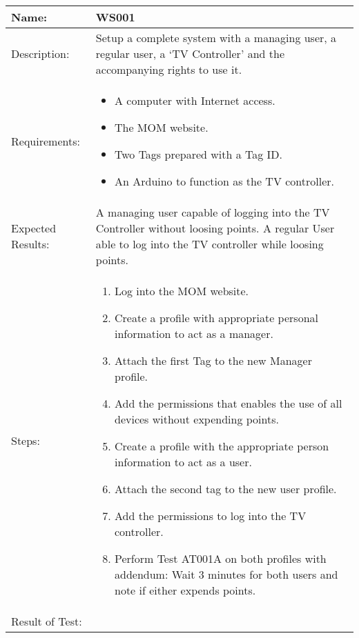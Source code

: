 \begin{table}[h]
	\centering
		\begin{tabular*}{\textwidth}{|l|l|}
		\hline
		\hline
		Name: & WS001\\
		\hline
		Description: & Setup a complete system with a managing user, a regular user, a `TV Controller' and the accompanying rights to use it.\\
		\hline
		Requirements: & \parbox{0.85\textwidth}{
		\begin{itemize}
			\item A computer with Internet access.
			\item The MOM website.
			\item Two Tags prepared with a Tag ID.
			\item An Arduino to function as the TV controller. 
		\end{itemize}}
		\\
		\hline
		Expected Results: & \parbox{.85\textwidth}{A managing user capable of logging into the TV Controller without loosing points. A regular User able to log into the TV controller while loosing points.}\\
		\hline
		Steps: & \parbox{.85\textwidth}{
		\begin{enumerate}
			\item Log into the MOM website.
			\item Create a profile with appropriate personal information to act as a manager.
			\item Attach the first Tag to the new Manager profile.
			\item Add the permissions that enables the use of all devices without expending points.
			\item Create a profile with the appropriate person information to act as a user.
			\item Attach the second tag to the new user profile.
			\item Add the permissions to log into the TV controller.
			\item Perform Test AT001A on both profiles with addendum: Wait 3 minutes for both users and note if either expends points.
		\end{enumerate}}
		\\		
		\hline
		Result of Test: & \\
		\hline
		\end{tabular*}
\end{table}

